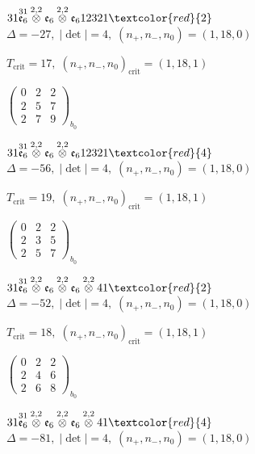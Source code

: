 \documentclass[10pt]{article}
\begin{document}
$31\overset{31}{\mathfrak{e}_6}\overset{2,2}{\otimes}\mathfrak{e}_6\overset{2,2}{\otimes}\mathfrak{e}_612321\textcolor{red}{2}$ \quad $\Delta=-27,\; |\det|=4,\; (n_+,n_-,n_0)=(1,18,0)$

\hspace{1em}$T_{\text{crit}}=17,\; (n_+,n_-,n_0)_{\text{crit}}=(1,18,1)$

\hspace{2em}$\left(\begin{smallmatrix}0 & 2 & 2 \\ 2 & 5 & 7 \\ 2 & 7 & 9\end{smallmatrix}\right)_{\!b_0}$

$31\overset{31}{\mathfrak{e}_6}\overset{2,2}{\otimes}\mathfrak{e}_6\overset{2,2}{\otimes}\mathfrak{e}_612321\textcolor{red}{4}$ \quad $\Delta=-56,\; |\det|=4,\; (n_+,n_-,n_0)=(1,18,0)$

\hspace{1em}$T_{\text{crit}}=19,\; (n_+,n_-,n_0)_{\text{crit}}=(1,18,1)$

\hspace{2em}$\left(\begin{smallmatrix}0 & 2 & 2 \\ 2 & 3 & 5 \\ 2 & 5 & 7\end{smallmatrix}\right)_{\!b_0}$

\smallskip

$31\overset{31}{\mathfrak{e}_6}\overset{2,2}{\otimes}\mathfrak{e}_6\overset{2,2}{\otimes}\mathfrak{e}_6\overset{2,2}{\otimes}41\textcolor{red}{2}$ \quad $\Delta=-52,\; |\det|=4,\; (n_+,n_-,n_0)=(1,18,0)$

\hspace{1em}$T_{\text{crit}}=18,\; (n_+,n_-,n_0)_{\text{crit}}=(1,18,1)$

\hspace{2em}$\left(\begin{smallmatrix}0 & 2 & 2 \\ 2 & 4 & 6 \\ 2 & 6 & 8\end{smallmatrix}\right)_{\!b_0}$

$31\overset{31}{\mathfrak{e}_6}\overset{2,2}{\otimes}\mathfrak{e}_6\overset{2,2}{\otimes}\mathfrak{e}_6\overset{2,2}{\otimes}41\textcolor{red}{4}$ \quad $\Delta=-81,\; |\det|=4,\; (n_+,n_-,n_0)=(1,18,0)$
\end{document}

